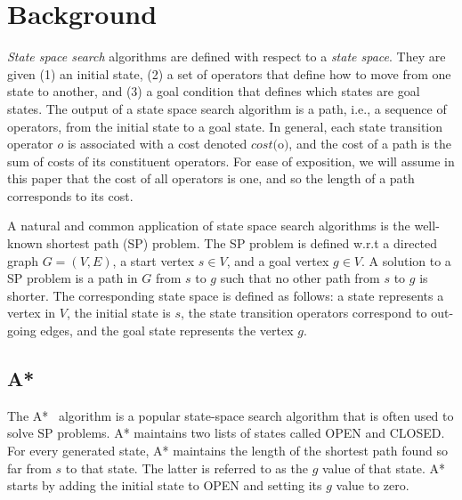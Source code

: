\documentclass[letterpaper]{article} %
\newcommand\AF[1]{\nb{\textbf{Ariel:}}{red}{#1}}
\begin{document}
\section{Background}



\emph{State space search} algorithms are defined with respect to a \emph{state space}.
They are given (1) an initial state,
(2) a set of operators that define how to move from one state to another, and (3) a goal condition that defines which states are goal states. The output of a state space search algorithm is a path, i.e., a sequence of operators, from the initial state to a goal state.
In general, each state transition operator $o$ is associated with a cost denoted $cost($o$)$, and the cost of a path is the sum of costs of its constituent operators. For ease of exposition, we will assume in this paper that the cost of all operators is one, and so the length of a path corresponds to its cost. %


A natural and common application of state space search algorithms is the well-known  shortest path (SP) problem. The SP problem is defined w.r.t a directed graph $G=(V,E)$, a start vertex $s\in V$, and a goal vertex $g\in V$.
A solution to a SP problem is a path in $G$ from $s$ to $g$ such that no other path from $s$ to $g$ is shorter. The corresponding state space is defined as follows: a state represents a vertex in $V$, the initial state is $s$, the state transition operators correspond to out-going edges, and the goal state represents the vertex $g$.






\subsection{A*}

The A*~\cite{hart1968formal} algorithm is a popular state-space search algorithm that is often used to solve SP problems.
A* maintains two lists of states called OPEN and CLOSED.
For every generated state, A* maintains the length of the shortest path found so far from $s$ to that state. The latter is referred to as the $g$ value of that state. A* starts by adding the initial state to OPEN and setting its $g$ value to zero.
\end{document}
